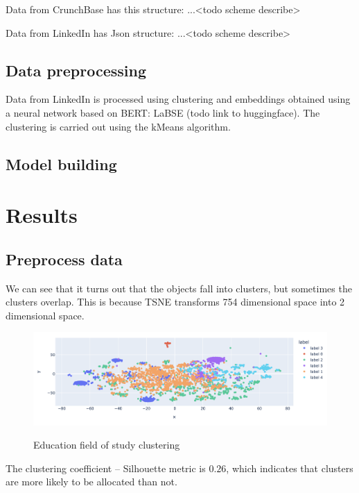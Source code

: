 \documentclass[twoside,twocolumn,12pt]{article}
\theoremstyle{plain}
\theoremstyle{definition}
\begin{document}
Data from CrunchBase has this structure: ...<todo scheme describe>

Data from LinkedIn has Json structure: ...<todo scheme describe>


\subsection{Data preprocessing}

Data from LinkedIn is processed using clustering and embeddings obtained using a neural network based on BERT: LaBSE (todo link to huggingface). The clustering is carried out using the kMeans algorithm.

\subsection{Model building}

\section{Results}

\subsection{Preprocess data}

We can see that it turns out that the objects fall into clusters, but sometimes the clusters overlap. This is because TSNE transforms 754 dimensional space into 2 dimensional space. 

\begin{figure}[!h]
  \centering
  \includegraphics[width=160mm]{figures/paper/kMeans-9_03.png}
  \label{fig:gd}
  \caption{Education field of study clustering}
\end{figure}

The clustering coefficient -- Silhouette  metric is $0.26$, which indicates that clusters are more likely to be allocated than not.
\end{document}
